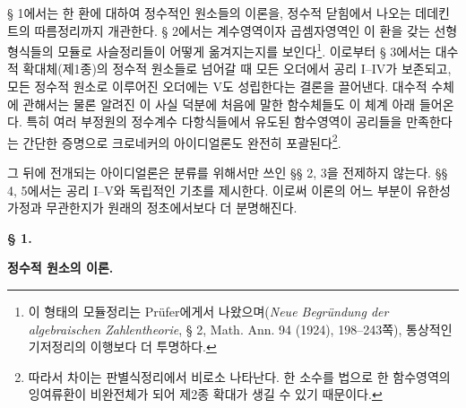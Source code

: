 § 1에서는 한 환에 대하여 정수적인 원소들의 이론을, 정수적 닫힘에서 나오는 데데킨트의 따름정리까지 개관한다. § 2에서는 계수영역이자 곱셈자영역인 이 환을 갖는 선형형식들의 모듈로 사슬정리들이 어떻게 옮겨지는지를 보인다\footnote{이 형태의 모듈정리는 Prüfer에게서 나왔으며(\emph{Neue Begründung der algebraischen Zahlentheorie}, § 2, Math. Ann. 94 (1924), 198--243쪽), 통상적인 기저정리의 이행보다 더 투명하다.}. 이로부터 § 3에서는 대수적 확대체(제1종)의 정수적 원소들로 넘어갈 때 모든 오더에서 공리 I--IV가 보존되고, 모든 정수적 원소로 이루어진 오더에는 V도 성립한다는 결론을 끌어낸다. 대수적 수체에 관해서는 물론 알려진 이 사실 덕분에 처음에 말한 함수체들도 이 체계 아래 들어온다. 특히 여러 부정원의 정수계수 다항식들에서 유도된 함수영역이 공리들을 만족한다는 간단한 증명으로 크로네커의 아이디얼론도 완전히 포괄된다\footnote{따라서 차이는 판별식정리에서 비로소 나타난다. 한 소수를 법으로 한 함수영역의 잉여류환이 비완전체가 되어 제2종 확대가 생길 수 있기 때문이다.}.

그 뒤에 전개되는 아이디얼론은 분류를 위해서만 쓰인 §§ 2, 3을 전제하지 않는다. §§ 4, 5에서는 공리 I--V와 독립적인 기초를 제시한다. 이로써 이론의 어느 부분이 유한성 가정과 무관한지가 원래의 정초에서보다 더 분명해진다.

\begin{center}
{\bfseries\large § 1.\par}
\vspace{0.35em}
{\bfseries\large 정수적 원소의 이론.\par}
\end{center}

